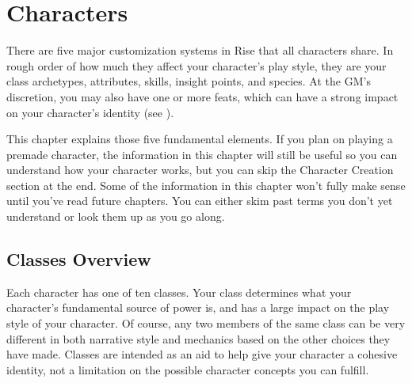 \chapter{Characters}

There are five major customization systems in Rise that all characters share.
In rough order of how much they affect your character's play style, they are your class archetypes, attributes, skills, insight points, and species.
At the GM's discretion, you may also have one or more feats, which can have a strong impact on your character's identity (see ).

This chapter explains those five fundamental elements.
If you plan on playing a premade character, the information in this chapter will still be useful so you can understand how your character works, but you can skip the Character Creation section at the end.
Some of the information in this chapter won't fully make sense until you've read future chapters.
You can either skim past terms you don't yet understand or look them up as you go along.

\section{Classes Overview}
    Each character has one of ten classes.
    Your class determines what your character's fundamental source of power is, and has a large impact on the play style of your character.
    Of course, any two members of the same class can be very different in both narrative style and mechanics based on the other choices they have made.
    Classes are intended as an aid to help give your character a cohesive identity, not a limitation on the possible character concepts you can fulfill.

